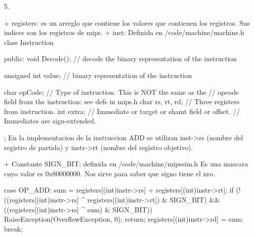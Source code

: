 5.

+ registers:  es un arreglo que contiene los valores que contienen los registros. Sus indices son los registros de mips.
+ inst: Definida en /code/machine/machine.h
class Instruction {
  public:
    void Decode();	// decode the binary representation of the instruction

    unsigned int value; // binary representation of the instruction

    char opCode;     // Type of instruction.  This is NOT the same as the
    		     // opcode field from the instruction: see defs in mips.h
    char rs, rt, rd; // Three registers from instruction.
    int extra;       // Immediate or target or shamt field or offset.
                     // Immediates are sign-extended.
};
En la implementacion de la instruccion ADD se utilizan inst->rs (nombre del registro de partida) y instr->rt (nombre del registro objetivo).

+ Constante SIGN_BIT: definida en /code/machine/mipssim.h
Es una mascara cuyo valor es  0x80000000. Nos sirve para saber que signo tiene el nro.


   case OP_ADD:
	sum = registers[(int)instr->rs] + registers[(int)instr->rt];
	if (!((registers[(int)instr->rs] ^ registers[(int)instr->rt]) & SIGN_BIT) &&
	    ((registers[(int)instr->rs] ^ sum) & SIGN_BIT)) {
	    RaiseException(OverflowException, 0);
	    return;
	}
	registers[(int)instr->rd] = sum;
	break;



